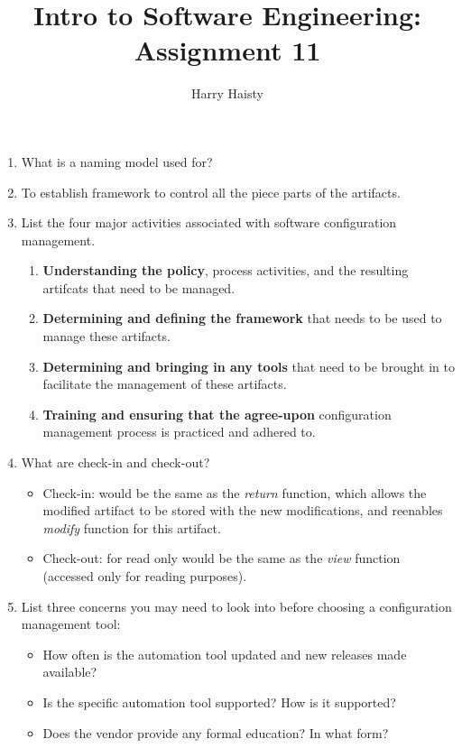 \documentclass[11pt]{article}
\title{Intro to Software Engineering: Assignment 11}
\author{Harry Haisty}
\begin{document}
    \maketitle
    \begin{enumerate}
    
    \item What is a naming model used for?
    \item[] To establish framework to control all the piece parts of the artifacts. 

    
    \item List the four major activities associated with software configuration management.
    \begin{enumerate}
        \item \textbf{Understanding the policy}, process activities, and the resulting artifcats that need to be managed.
        \item \textbf{Determining and defining the framework} that needs to be used to manage these artifacts.
        \item \textbf{Determining and bringing in any tools} that need to be brought in to facilitate the management of these artifacts. 
        \item \textbf{Training and ensuring that the agree-upon} configuration management process is practiced and adhered to.
    \end{enumerate}
    
    \item What are check-in and check-out?
    \begin{itemize}
        \item[] Check-in: would be the same as the \textit{return} function, which allows the modified artifact to be stored with the new modifications, and reenables \textit{modify} function for this artifact. 
        \item[] Check-out: for read only would be the same as the \textit{view} function (accessed only for reading purposes).  
    \end{itemize}
    
    \item List three concerns you may need to look into before choosing a configuration management tool:
    \begin{itemize}
        \item How often is the automation tool updated and new releases made available?
        \item Is the specific automation tool supported? How is it supported?
        \item Does the vendor provide any formal education? In what form?
    \end{itemize}
    

\end{enumerate}
\end{document}
